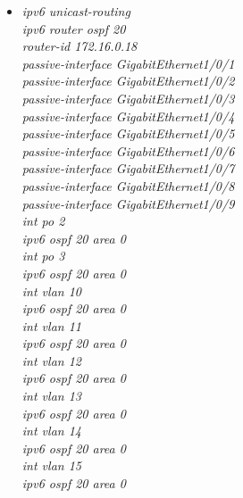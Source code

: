 \documentclass[a4paper, 12pt]{article}
\begin{document}
\begin{itemize}
\begin{itemize}
        \begin{itemize}
         \item \textit{ipv6 unicast-routing\\
                        ipv6 router ospf 20\\
                       router-id 172.16.0.18\\
                         passive-interface GigabitEthernet1/0/1\\
                         passive-interface GigabitEthernet1/0/2\\
                         passive-interface GigabitEthernet1/0/3\\
                         passive-interface GigabitEthernet1/0/4\\
                         passive-interface GigabitEthernet1/0/5\\
                         passive-interface GigabitEthernet1/0/6\\
                         passive-interface GigabitEthernet1/0/7\\
                         passive-interface GigabitEthernet1/0/8\\
                         passive-interface GigabitEthernet1/0/9\\
                        int po 2\\
                        ipv6 ospf 20 area 0\\
                        int po 3\\
                        ipv6 ospf 20 area 0\\
                        int vlan 10\\
                        ipv6 ospf 20 area 0\\
                        int vlan 11\\
                        ipv6 ospf 20 area 0\\
                        int vlan 12\\
                        ipv6 ospf 20 area 0\\
                        int vlan 13\\
                        ipv6 ospf 20 area 0\\
                        int vlan 14\\
                        ipv6 ospf 20 area 0\\
                        int vlan 15\\
                        ipv6 ospf 20 area 0\\
}
\end{itemize}
\end{itemize}
\end{itemize}
\end{document}
